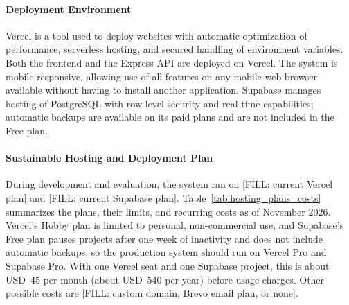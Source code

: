 \paragraph{Deployment Environment}
\label{par:deployment_environment}

\hspace*{\parindent}Vercel is a tool used to deploy websites with automatic optimization of performance, serverless hosting, and secured handling of environment variables. Both the frontend and the Express API are deployed on Vercel. The system is mobile responsive, allowing use of all features on any mobile web browser available without having to install another application. Supabase manages hosting of PostgreSQL with row level security and real-time capabilities; automatic backups are available on its paid plans and are not included in the Free plan.

\paragraph{Sustainable Hosting and Deployment Plan}
\label{par:sustainable_hosting_and_deployment_plan}

\hspace*{\parindent}During development and evaluation, the system ran on [FILL: current Vercel plan] and [FILL: current Supabase plan]. Table~\ref{tab:hosting_plans_costs} summarizes the plans, their limits, and recurring costs as of November 2026. Vercel's Hobby plan is limited to personal, non-commercial use, and Supabase's Free plan pauses projects after one week of inactivity and does not include automatic backups, so the production system should run on Vercel Pro and Supabase Pro. With one Vercel seat and one Supabase project, this is about USD~45 per month (about USD~540 per year) before usage charges. Other possible costs are [FILL: custom domain, Brevo email plan, or none].

